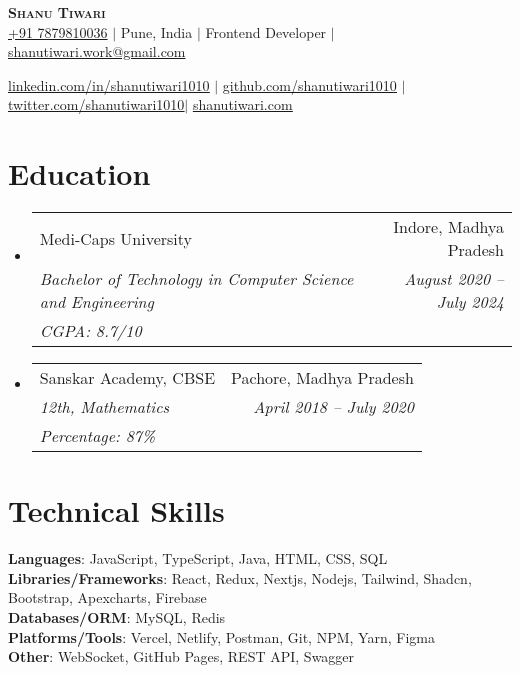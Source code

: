 \documentclass[letterpaper,10pt]{article}
\makeatletter
\newcommand{\resumeEduheading}[5]{
    \vspace{2pt}\item
      \begin{tabular*}{0.97\textwidth}[t]{l@{\extracolsep{\fill}}r}
        {#1} & #2 \\
        \textit{\small#3} & \textit{\small #4}\\
        \textit{\small#5} \\
      \end{tabular*}\vspace{-7pt}
  }
\newcommand{\resumeSubHeadingListStart}{\begin{itemize}[leftmargin=0.15in, label={}]}
\newcommand{\resumeSubHeadingListEnd}{\end{itemize}}
\makeatother
\begin{document}

\begin{center}
  \textbf{\Huge \scshape Shanu Tiwari} \\ \vspace{1pt}
  \href{tel:7879810036}{+91 7879810036} $|$
  {Pune, India} $|$
  {Frontend Developer} $|$
  \href{mailto:shanutiwari.work@gmail.com}{shanutiwari.work@gmail.com} \\ \vspace{1pt}

  \href{https://linkedin.com/in/shanutiwari1010}{\underline{linkedin.com/in/shanutiwari1010}} $|$
  \href{https://github.com/shanutiwari1010}{\underline{github.com/shanutiwari1010}} $|$
  \href{https://twitter.com/shanutiwari1010}{\underline{twitter.com/shanutiwari1010}}$|$
   \href{https://shanutiwari.com/}{\underline{shanutiwari.com}} 
  
\end{center}

\section{Education}
\resumeSubHeadingListStart
\resumeEduheading
{Medi-Caps University}{Indore, Madhya Pradesh}
{Bachelor of Technology in Computer Science and Engineering}{August 2020 -- July 2024}
{CGPA: 8.7/10}
\resumeEduheading
{Sanskar Academy, CBSE}{Pachore, Madhya Pradesh}
{12th, Mathematics}{April 2018 -- July 2020}
{Percentage: 87\%}
\resumeSubHeadingListEnd

\section{Technical Skills}
\begin{itemize}[leftmargin=0.15in, label={}]
  \small{\item{
        \textbf{Languages}{: \hfill JavaScript, TypeScript, Java, HTML, CSS, SQL \hfill} \\
        \vspace{3pt}\textbf{Libraries/Frameworks}{: \hfill React, Redux, Nextjs, Nodejs, Tailwind, Shadcn, Bootstrap, Apexcharts, Firebase \hfill} \\
        \vspace{3pt}\textbf{Databases/ORM}{: \hfill MySQL, Redis \hfill} \\
        \vspace{3pt}\textbf{Platforms/Tools}{: \hfill Vercel, Netlify, Postman, Git, NPM, Yarn, Figma \hfill} \\
        \vspace{3pt}\textbf{Other}{: \hfill WebSocket, GitHub Pages, REST API, Swagger \hfill} \\
        }}
\end{itemize}
\end{document}
